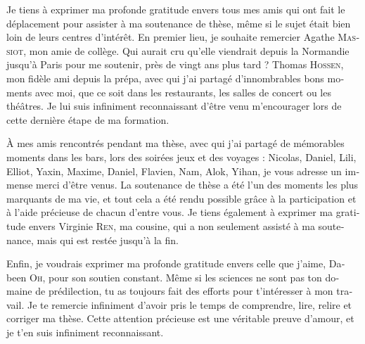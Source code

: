 \begin{otherlanguage}{french}
Je tiens à exprimer ma profonde gratitude envers tous mes amis qui ont fait le déplacement pour assister à ma soutenance de thèse, même si le sujet était bien loin de leurs centres d'intérêt. En premier lieu, je souhaite remercier Agathe \textsc{Massiot}, mon amie de collège. Qui aurait cru qu'elle viendrait depuis la Normandie jusqu'à Paris pour me soutenir, près de vingt ans plus tard ? Thomas \textsc{Hossen}, mon fidèle ami depuis la prépa, avec qui j'ai partagé d'innombrables bons moments avec moi, que ce soit dans les restaurants, les salles de concert ou les théâtres. Je lui suis infiniment reconnaissant d'être venu m'encourager lors de cette dernière étape de ma formation.

À mes amis rencontrés pendant ma thèse, avec qui j'ai partagé de mémorables moments dans les bars, lors des soirées jeux et des voyages : Nicolas, Daniel, Lili, Elliot, Yaxin, Maxime, Daniel, Flavien, Nam, Alok, Yihan, je vous adresse un immense merci d'être venus. La soutenance de thèse a été l'un des moments les plus marquants de ma vie, et tout cela a été rendu possible grâce à la participation et à l'aide précieuse de chacun d'entre vous.
Je tiens également à exprimer ma gratitude envers Virginie \textsc{Ren}, ma cousine, qui a non seulement assisté à ma soutenance, mais qui est restée jusqu'à la fin. 

Enfin, je voudrais exprimer ma profonde gratitude envers celle que j'aime, Dabeen \textsc{Oh}, pour son soutien constant. Même si les sciences ne sont pas ton domaine de prédilection, tu as toujours fait des efforts pour t'intéresser à mon travail. Je te remercie infiniment d'avoir pris le temps de comprendre, lire, relire et corriger ma thèse. Cette attention précieuse est une véritable preuve d'amour, et je t'en suis infiniment reconnaissant.

\endgroup
\clearpage

%
%
%
%
%
%
%

\end{otherlanguage}

